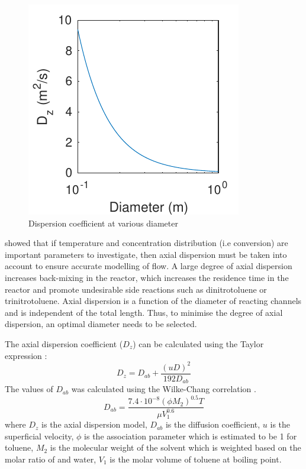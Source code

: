\begin{figure}
    \includegraphics[scale=0.9]{figures/D_z}
    \caption{Dispersion coefficient at various diameter}
    \label{fig:dispersion}
\end{figure}
\textcite{young_axial_1973} showed that if temperature and concentration distribution (i.e conversion) are important parameters to investigate, then axial dispersion must be taken into account to ensure accurate modelling of flow. A large degree of axial dispersion increases back-mixing in the reactor, which increases the residence time in the reactor and promote undesirable side reactions such as dinitrotoluene or trinitrotoluene. Axial dispersion is a function of the diameter of reacting channels and is independent of the total length. Thus, to minimise the degree of axial dispersion, an optimal diameter needs to be selected. 

The axial dispersion coefficient ($D_z$) can be calculated using the Taylor expression \cite{froment_chemical_2011}: 
\begin{equation}
    D_z=D_{ab}+\frac{(uD)^2}{192D_{ab}}
    \label{eq: axial dispersion coefficient}
\end{equation}
The values of $D_{ab}$ was calculated using the Wilke-Chang correlation \cite{wilke_correlation_1955}.
\begin{equation}
    D_{ab}=\frac{7.4\cdot 10^{-8}(\phi M_2)^{0.5}T}{\mu V_1^{0.6}}
    \label{wilkechang}
\end{equation}
where $D_z$ is the axial dispersion model, $D_{ab}$ is the diffusion coefficient, $u$ is the superficial velocity, $\phi$ is the association parameter which is estimated to be 1 for toluene, $M_2$ is the molecular weight of the solvent which is weighted based on the molar ratio of  and water, $V_1$ is the molar volume of toluene at boiling point.

